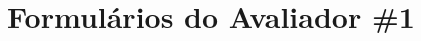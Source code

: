 \documentclass[portuguese,oneside]{tcc}
\begin{document}
%



\appendix

\chapter{\label{apnd:form-1-infos}Formulários do Avaliador \#1}
\end{document}
